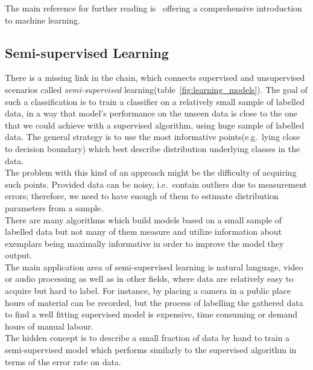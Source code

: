 \documentclass[12pt, a4paper, pdflatex, leqno, twoside]{report}
\begin{document}
The main reference for further reading is~\citep{flach2012machine} offering a 
comprehensive introduction to machine learning.


\subsection{Semi-supervised Learning}
There is a missing link in the chain, which connects supervised and 
unsupervised scenarios called \emph{semi-supervised} learning(table~\ref{fig:learning_models}). The goal of such a classification is to train a
classifier on a relatively small sample of labelled data, in a way that model's 
performance on the unseen data is close to the one that we could achieve with a 
supervised algorithm, using huge sample of labelled data. The general strategy is 
to use the most informative points(e.g.\ lying close to decision boundary) which best describe distribution underlying 
classes in the data.\\
The problem with this kind of an approach might be the difficulty of acquiring such points. Provided 
data can be noisy, i.e.\ contain outliers due to measurement errors; therefore, we 
need to have enough of them to estimate distribution parameters from a sample.\\
There are many algorithms which build models based on a small sample of labelled 
data but not many of them measure and utilize information about exemplars being 
maximally informative in order to improve the model they output.\\

The main application area of semi-supervised learning is natural language, 
video or audio processing as well as in other fields, where data are relatively easy to 
acquire but hard to label. For instance, by placing a camera in a public place hours of material 
can be recorded, but the process of labelling the gathered data to find a well 
fitting supervised model is expensive, time consuming or demand hours of manual 
labour.\\
The hidden concept is to describe a small fraction of data by hand to train a semi-supervised model which performs similarly to the supervised algorithm in terms of the
error rate on data.
\end{document}
